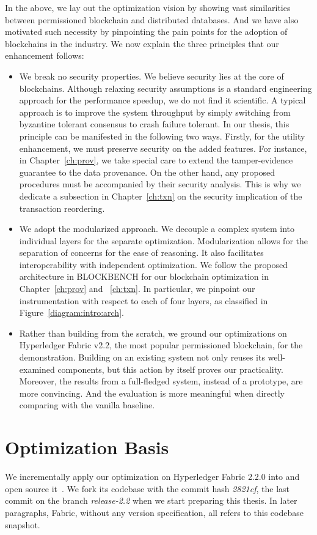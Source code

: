 In the above, we lay out the optimization vision by showing vast similarities between permissioned blockchain and distributed databases. 
And we have also motivated such necessity by pinpointing the pain points for the adoption of blockchains in the industry. 
We now explain the three principles that our enhancement follows:

\begin{itemize}
  \item We break no security properties. We believe security lies at the core of blockchains. Although relaxing security assumptions is a standard engineering approach for the performance speedup, we do not find it scientific. A typical approach is to improve the system throughput by simply switching from byzantine tolerant consensus to crash failure tolerant. In our thesis, this principle can be manifested in the following two ways. Firstly, for the utility enhancement, we must preserve security on the added features. For instance, in Chapter~\ref{ch:prov}, we take special care to extend the tamper-evidence guarantee to the data provenance. On the other hand, any proposed procedures must be accompanied by their security analysis. This is why we dedicate a subsection in Chapter~\ref{ch:txn} on the security implication of the transaction reordering. 
  \item We adopt the modularized approach. We decouple a complex system into individual layers for the separate optimization. Modularization allows for the separation of concerns for the ease of reasoning. It also facilitates interoperability with independent optimization. 
  We follow the proposed architecture in BLOCKBENCH for our blockchain optimization in Chapter~\ref{ch:prov} and ~\ref{ch:txn}. In particular, we pinpoint our instrumentation with respect to each of four layers, as classified in Figure~\ref{diagram:intro:arch}. 
  \item Rather than building from the scratch, we ground our optimizations on Hyperledger Fabric v2.2, the most popular permissioned blockchain, for the demonstration. Building on an existing system not only reuses its well-examined components, but this action by itself proves our practicality. Moreover, the results from a full-fledged system, instead of a prototype, are more convincing. And the evaluation is more meaningful when directly comparing with the vanilla baseline. 
\end{itemize}

\section{Optimization Basis}
We incrementally apply our optimization on Hyperledger Fabric 2.2.0 into {\fs} and open source it~\cite{fsharp}. We fork its codebase with the commit hash \textit{2821cf}, the last commit on the branch \textit{release-2.2} when we start preparing this thesis. In later paragraphs, Fabric, without any version specification, all refers to this codebase snapshot. 

